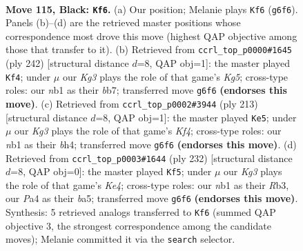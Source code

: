 \documentclass[11pt]{article}
\begin{document}
\clearpage

\begin{figure}[p]\centering
\begin{subfigure}{0.46\textwidth}\centering
\resizebox{\linewidth}{!}{%
\newchessgame
\chessboard[
  setfen={1B6/8/6k1/8/p1p3b1/8/5K2/1N6 b - - 85 115},
  showmover=false,
  pgfstyle=straightmove, color=movearrow, markmove={g6-f6}
]}
\caption{}
\end{subfigure}\hfill
\begin{subfigure}{0.46\textwidth}\centering
\resizebox{\linewidth}{!}{%
\newchessgame
\chessboard[
  setfen={5B2/Pb6/4k3/2P3K1/8/8/8/8 w - - 13 122},
  showmover=false,
  pgfstyle=straightmove, color=movearrow, markmove={g5-f4}
]}
\caption{}
\end{subfigure}
\\[4pt]
\begin{subfigure}{0.46\textwidth}\centering
\resizebox{\linewidth}{!}{%
\newchessgame
\chessboard[
  setfen={8/1b6/8/5k1p/5p1B/8/8/5K2 b - - 61 107},
  showmover=false,
  pgfstyle=straightmove, color=movearrow, markmove={f5-e5}
]}
\caption{}
\end{subfigure}\hfill
\begin{subfigure}{0.46\textwidth}\centering
\resizebox{\linewidth}{!}{%
\newchessgame
\chessboard[
  setfen={8/3k1p2/8/b5P1/4K3/1R6/8/8 w - - 87 117},
  showmover=false,
  pgfstyle=straightmove, color=movearrow, markmove={e4-f5}
]}
\caption{}
\end{subfigure}
\caption{\textbf{Move 115, Black: \texttt{Kf6}.} (a) Our position; Melanie plays \texttt{Kf6} (\texttt{g6f6}). Panels (b)--(d) are the retrieved master positions whose correspondence most drove this move (highest QAP objective among those that transfer to it). (b) Retrieved from \texttt{ccrl\_top\_p0000\#1645} (ply 242) [structural distance $d$=8, QAP obj=1]: the master played \texttt{Kf4}; under $\mu$ our \emph{Kg3} plays the role of that game's \emph{Kg5}; cross-type roles: our \emph{n}b1 as their \emph{b}b7; transferred move \texttt{g6f6} \textbf{(endorses this move)}. (c) Retrieved from \texttt{ccrl\_top\_p0002\#3944} (ply 213) [structural distance $d$=8, QAP obj=1]: the master played \texttt{Ke5}; under $\mu$ our \emph{Kg3} plays the role of that game's \emph{Kf4}; cross-type roles: our \emph{n}b1 as their \emph{b}h4; transferred move \texttt{g6f6} \textbf{(endorses this move)}. (d) Retrieved from \texttt{ccrl\_top\_p0003\#1644} (ply 232) [structural distance $d$=8, QAP obj=0]: the master played \texttt{Kf5}; under $\mu$ our \emph{Kg3} plays the role of that game's \emph{Ke4}; cross-type roles: our \emph{n}b1 as their \emph{R}b3, our \emph{P}a4 as their \emph{b}a5; transferred move \texttt{g6f6} \textbf{(endorses this move)}. Synthesis: 5 retrieved analogs transferred to \texttt{Kf6} (summed QAP objective 3, the strongest correspondence among the candidate moves); Melanie committed it via the \texttt{search} selector.}
\label{fig:thought-m229}
\end{figure}
\end{document}
